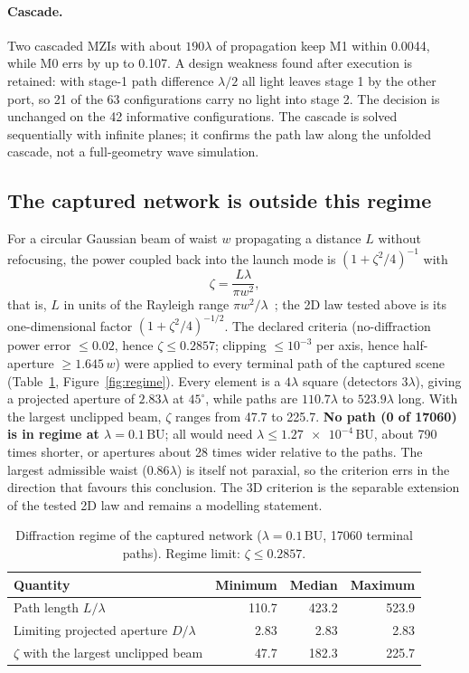 \documentclass[11pt,a4paper]{article}
\newcommand{\BU}{\,\mathrm{BU}}
\begin{document}
\paragraph{Cascade.} Two cascaded MZIs with about $190\lambda$ of propagation keep M1 within 0.0044, while M0 errs by up to 0.107. A design weakness found after execution is retained: with stage-1 path difference $\lambda/2$ all light leaves stage 1 by the other port, so 21 of the 63 configurations carry no light into stage 2. The decision is unchanged on the 42 informative configurations. The cascade is solved sequentially with infinite planes; it confirms the path law along the unfolded cascade, not a full-geometry wave simulation.

\subsection{The captured network is outside this regime}
For a circular Gaussian beam of waist $w$ propagating a distance $L$ without refocusing, the power coupled back into the launch mode is $(1+\zeta^2/4)^{-1}$ with
\begin{equation}
  \zeta = \frac{L\lambda}{\pi w^2},
  \label{eq:zeta}
\end{equation}
that is, $L$ in units of the Rayleigh range $\pi w^2/\lambda$~\cite{kogelnik1966}; the 2D law tested above is its one-dimensional factor $(1+\zeta^2/4)^{-1/2}$. The declared criteria (no-diffraction power error $\le 0.02$, hence $\zeta \le 0.2857$; clipping $\le 10^{-3}$ per axis, hence half-aperture $\ge 1.645\,w$) were applied to every terminal path of the captured scene (Table~\ref{tab:regime}, Figure~\ref{fig:regime}). Every element is a $4\lambda$ square (detectors $3\lambda$), giving a projected aperture of $2.83\lambda$ at $45^\circ$, while paths are $110.7\lambda$ to $523.9\lambda$ long. With the largest unclipped beam, $\zeta$ ranges from 47.7 to 225.7. \textbf{No path (0 of \num{17060}) is in regime at $\lambda = 0.1\BU$}; all would need $\lambda \le \num{1.27e-4}\BU$, about 790 times shorter, or apertures about 28 times wider relative to the paths. The largest admissible waist ($0.86\lambda$) is itself not paraxial, so the criterion errs in the direction that favours this conclusion. The 3D criterion is the separable extension of the tested 2D law and remains a modelling statement.

\begin{table}[t]
\centering
\caption{Diffraction regime of the captured network ($\lambda = 0.1\BU$, \num{17060} terminal paths). Regime limit: $\zeta \le 0.2857$.}
\label{tab:regime}
\small
\begin{tabular}{@{}lrrr@{}}
\toprule
Quantity & Minimum & Median & Maximum \\
\midrule
Path length $L/\lambda$ & 110.7 & 423.2 & 523.9 \\
Limiting projected aperture $D/\lambda$ & 2.83 & 2.83 & 2.83 \\
$\zeta$ with the largest unclipped beam & 47.7 & 182.3 & 225.7 \\
\bottomrule
\end{tabular}
\end{table}
\end{document}
